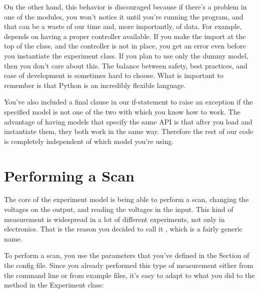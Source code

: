 On the other hand, this behavior is discouraged because if there's a problem in one of the modules, you won't notice it until you're running the program, and that can be a waste of our time and, more importantly, of data. For example,  depends on having a proper controller available. If you make the import at the top of the class, and the controller is not in place, you get an error even before you instantiate the experiment class. If you plan to use only the dummy model, then you don't care about this. The balance between safety, best practices, and ease of development is sometimes hard to choose. What is important to remember is that Python is an incredibly flexible language.

You've also included a final clause in our if-statement to raise an exception if the specified model is not one of the two with which you know how to work. The advantage of having models that specify the same API is that after you load and instantiate them, they both work in the same way. Therefore the rest of our code is completely independent of which model you're using.


\section{Performing a Scan}\label{sec:doing-scan}
The core of the experiment model is being able to perform a scan, changing the voltages on the output, and reading the voltages in the input. This kind of measurement is widespread in a lot of different experiments, not only in electronics. That is the reason you decided to call it , which is a fairly generic name.


To perform a scan, you use the parameters that you've defined in the  Section of the config file. Since you already performed this type of measurement either from the command line or from example files, it's easy to adapt to what you did to the method in the Experiment class:

